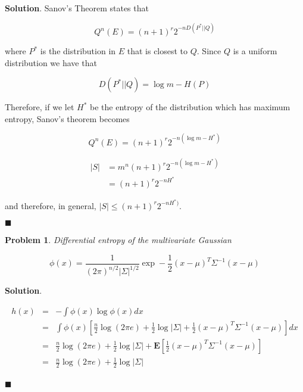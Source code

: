 \documentclass[12pt]{article}
\newtheorem{p}{Problem}[section]
\theoremstyle{definition}
\newenvironment{s}{%
        \begin{trivlist} \item \textbf{Solution}. }{%
            \hspace*{\fill} $\blacksquare$\end{trivlist}}%
\begin{document}
{\begin{s}
Sanov's Theorem states that 

\begin{equation*}
Q^{n}(E) = (n+1)^{r}2^{-nD(P^{*}||Q)}
\end{equation*}

where $P^{*}$ is the distribution in $E$ that is closest to $Q$. Since $Q$ is a uniform distribution we have that 

\begin{equation*}
D(P^{*}||Q) = \log m - H(P)
\end{equation*}

Therefore, if we let $H^{*}$ be the entropy of the distribution which has maximum entropy, Sanov's theorem becomes 

\begin{equation*}
Q^{n}(E) = (n+1)^{r}2^{-n(\log m - H^{*})}
\end{equation*}

\begin{align*}
|S| &= m^{n} (n+1)^{r}2^{-n(\log m - H^{*})} \\
&= (n+1)^{r}2^{-nH^{*}}  
\end{align*}

and therefore, in general, $|S| \leq (n+1)^{r}2^{-nH^{*})}  $.


\end{s}

\begin{p}
Differential entropy of the multivariate Gaussian

\begin{equation*}
\phi(x) = \frac{1}{(2\pi)^{n/2}|\Sigma|^{1/2}}\exp-\frac{1}{2}(x-\mu)^{T}\Sigma^{-1}(x-\mu)
\end{equation*}

\end{p}

\begin{s}


\begin{eqnarray*}
h(x) &=& -\int \phi(x)\log \phi(x) dx\\
&=& \int \phi(x) \left[\frac{n}{2}\log (2\pi e) +\frac{1}{2} \log|\Sigma| + \frac{1}{2}(x-\mu)^{T}\Sigma^{-1}(x-\mu)\right]dx\\
&=& \frac{n}{2}\log (2\pi e) +\frac{1}{2} \log|\Sigma| + \mathbf{E}\left[\frac{1}{2}(x-\mu)^{T}\Sigma^{-1}(x-\mu)\right]\\
&=& \frac{n}{2}\log (2\pi e) +\frac{1}{2} \log|\Sigma|\\
\end{eqnarray*}

\end{s}
\end{document}
